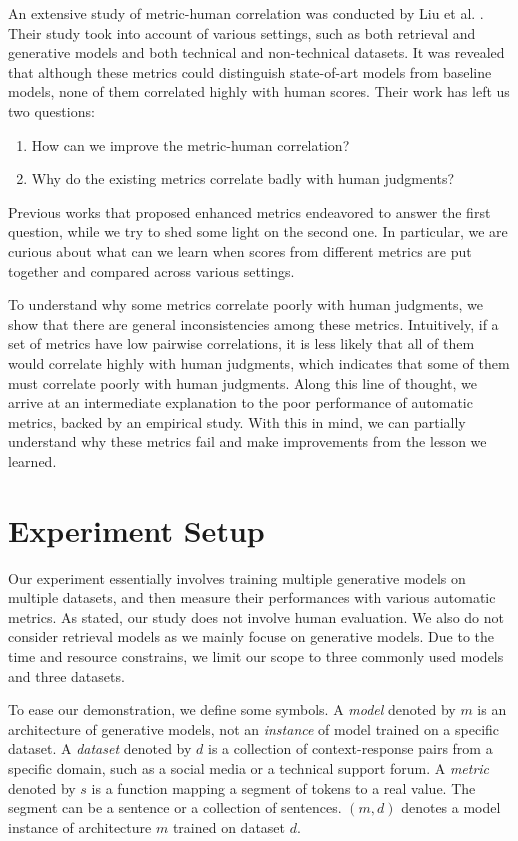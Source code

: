 \documentclass[runningheads]{llncs}
\begin{document}
    An extensive study of metric-human correlation was conducted by Liu et al. \cite{HowNot}. Their study took into account of various settings, such as both retrieval and generative models and both technical and non-technical datasets. It was revealed that although these metrics could distinguish state-of-art models from baseline models, none of them correlated highly with human scores. Their work has left us two questions:
    \begin{enumerate}
        \item How can we improve the metric-human correlation?
        \item Why do the existing metrics correlate badly with human judgments?
    \end{enumerate}
    Previous works that proposed enhanced metrics endeavored to answer the first question, while we try to shed some light on the second one. In particular, we are curious about what can we learn when scores from different metrics are put together and compared across various settings.

    To understand why some metrics correlate poorly with human judgments, we show that there are general inconsistencies among these metrics. Intuitively, if a set of metrics have low pairwise correlations, it is less likely that all of them would correlate highly with human judgments, which indicates that some of them must correlate poorly with human judgments. Along this line of thought, we arrive at an intermediate explanation to the poor performance of automatic metrics, backed by an empirical study. With this in mind, we can partially understand why these metrics fail and make improvements from the lesson we learned.

    \section{Experiment Setup}
    Our experiment essentially involves training multiple generative models on multiple datasets, and then measure their performances with various automatic metrics. As stated, our study does not involve human evaluation. We also do not consider retrieval models as we mainly focuse on generative models. Due to the time and resource constrains, we limit our scope to three commonly used models and three datasets.

    To ease our demonstration, we define some symbols. A \emph{model} denoted by $m$ is an architecture of generative models, not an \emph{instance} of model trained on a specific dataset. A \emph{dataset} denoted by $d$ is a collection of context-response pairs from a specific domain, such as a social media or a technical support forum. A \emph{metric} denoted by $s$ is a function mapping a segment of tokens to a real value. The segment can be a sentence or a collection of sentences. $(m, d)$ denotes a model instance of architecture $m$ trained on dataset $d$.
\end{document}

